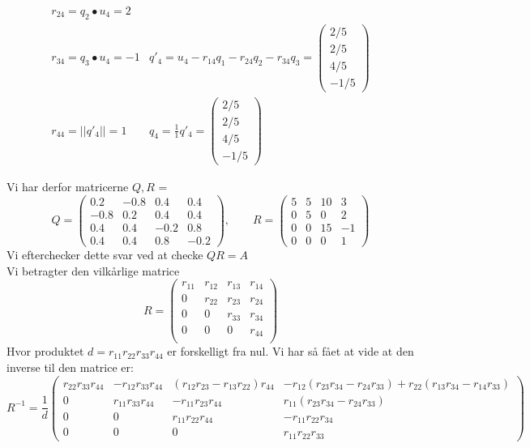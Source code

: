 \documentclass[a4paper,fleqn]{article}
\begin{document}
\begin{equation}
\begin{array}{ll}
r_{24} = q_2 \bullet u_4 = 2 & \\
r_{34} = q_3 \bullet u_4 = -1& q'_4 = u_4 - r_{14}q_1 - r_{24}q_2 - r_{34}q_3 = \begin{pmatrix}2/5\\2/5\\4/5\\-1/5\end{pmatrix}\\
r_{44} = ||q'_4|| = 1 & q_4 = \frac{1}{1}q'_4 = \begin{pmatrix}2/5\\2/5\\4/5\\-1/5\end{pmatrix}
		\end{array}
	\end{equation}

	Vi har derfor matricerne $Q,R$ = 
	\[ Q = \left(\begin{array}{rrrr}
0.2 & -0.8 & 0.4 & 0.4 \\
-0.8 & 0.2 & 0.4 & 0.4 \\
0.4 & 0.4 & -0.2 & 0.8 \\
0.4 & 0.4 & 0.8 & -0.2
\end{array}\right),\qquad 
	R =\left(\begin{array}{rrrr}
5 & 5 & 10 & 3 \\
0 & 5 & 0 & 2 \\
0 & 0 & 15 & -1 \\
0 & 0 & 0 & 1
\end{array}\right)
\] Vi efterchecker dette svar ved at checke $QR = A$\\


	Vi betragter den vilkårlige matrice 
	\[ R = \begin{pmatrix}
			r_{11} & r_{12} & r_{13} & r_{14}\\
			0 & r_{22} & r_{23} & r_{24}\\
			0 & 0 & r_{33} & r_{34}\\
			0 & 0 & 0 & r_{44} \\
	\end{pmatrix}\]
	Hvor produktet $d = r_{11}r_{22}r_{33}r_{44}$ er forskelligt fra nul. Vi har så fået at
	vide at den inverse til den matrice er:
	\[R^{-1} = \frac{1}{d} \begin{pmatrix}
			r_{22}r_{33}r_{44} & -r_{12}r_{33}r_{44} & (r_{12}r_{23} - r_{13}r_{22})r_{44} & -r_{12}(r_{23}r_{34} - r_{24}r_{33} ) + r_{22}(r_{13}r_{34} - r_{14}r_{33})\\
			0& r_{11}r_{33}r_{44} &-r_{11} r_{23} r_{44} & r_{11}(r_{23}r_{34} - r_{24}r_{33})\\
			0&0&r_{11}r_{22}r_{44}&-r_{11}r_{22}r_{34}\\
			0&0&0&r_{11}r_{22}r_{33}
	\end{pmatrix}\]	
\end{document}
